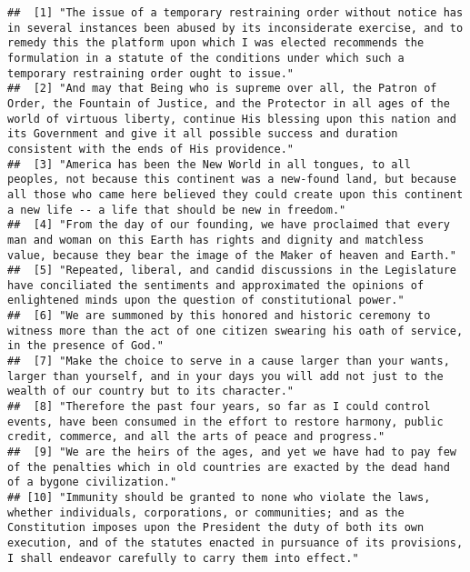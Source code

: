 \documentclass[]{article}
\begin{document}
\begin{verbatim}
##  [1] "The issue of a temporary restraining order without notice has in several instances been abused by its inconsiderate exercise, and to remedy this the platform upon which I was elected recommends the formulation in a statute of the conditions under which such a temporary restraining order ought to issue."     
##  [2] "And may that Being who is supreme over all, the Patron of Order, the Fountain of Justice, and the Protector in all ages of the world of virtuous liberty, continue His blessing upon this nation and its Government and give it all possible success and duration consistent with the ends of His providence."       
##  [3] "America has been the New World in all tongues, to all peoples, not because this continent was a new-found land, but because all those who came here believed they could create upon this continent a new life -- a life that should be new in freedom."                                                              
##  [4] "From the day of our founding, we have proclaimed that every man and woman on this Earth has rights and dignity and matchless value, because they bear the image of the Maker of heaven and Earth."                                                                                                                   
##  [5] "Repeated, liberal, and candid discussions in the Legislature have conciliated the sentiments and approximated the opinions of enlightened minds upon the question of constitutional power."                                                                                                                          
##  [6] "We are summoned by this honored and historic ceremony to witness more than the act of one citizen swearing his oath of service, in the presence of God."                                                                                                                                                             
##  [7] "Make the choice to serve in a cause larger than your wants, larger than yourself, and in your days you will add not just to the wealth of our country but to its character."                                                                                                                                         
##  [8] "Therefore the past four years, so far as I could control events, have been consumed in the effort to restore harmony, public credit, commerce, and all the arts of peace and progress."                                                                                                                              
##  [9] "We are the heirs of the ages, and yet we have had to pay few of the penalties which in old countries are exacted by the dead hand of a bygone civilization."                                                                                                                                                         
## [10] "Immunity should be granted to none who violate the laws, whether individuals, corporations, or communities; and as the Constitution imposes upon the President the duty of both its own execution, and of the statutes enacted in pursuance of its provisions, I shall endeavor carefully to carry them into effect."
\end{verbatim}
\end{document}
